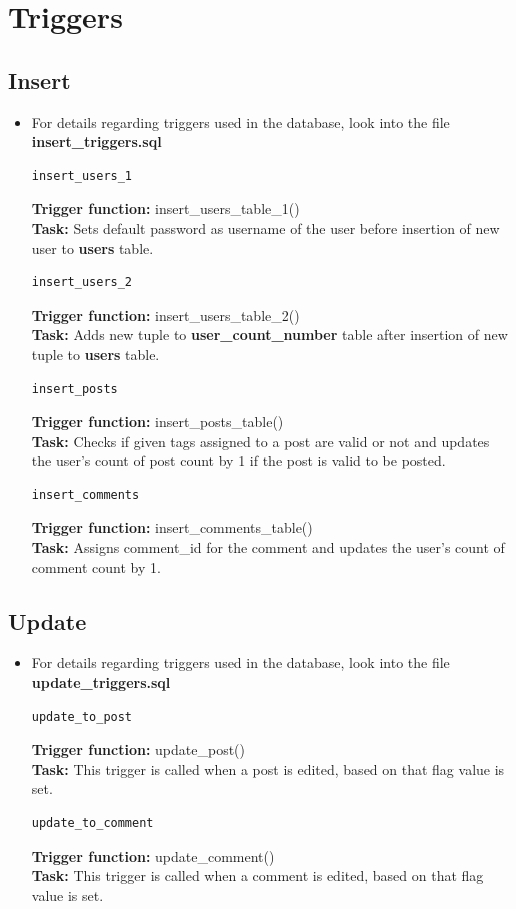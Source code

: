 \documentclass[12pt,a4paper]{article}
\begin{document}
	\section{Triggers}

	\subsection{Insert}
		\begin{itemize}
	\item For details regarding triggers used in the database, look into the file \textbf{insert\_triggers.sql}
			\begin{lstlisting}[language=SQL, style = mystyle]
		insert_users_1 
	\end{lstlisting}
\textbf{Trigger function: }insert\_users\_table\_1()\\
\textbf{Task: }Sets default password as username of the user before insertion of new user to \textbf{users} table.
			\begin{lstlisting}[language=SQL, style = mystyle]
	insert_users_2
\end{lstlisting}
\textbf{Trigger function: }insert\_users\_table\_2()\\
\textbf{Task: }Adds new tuple to \textbf{user\_count\_number} table after insertion of new tuple to \textbf{users} table.
			\begin{lstlisting}[language=SQL, style = mystyle]
	insert_posts 
\end{lstlisting}
\textbf{Trigger function: }insert\_posts\_table()\\
\textbf{Task: }Checks if given tags assigned to a post are valid or not and updates the user's count of post count by 1 if the post is  valid to be posted.
			\begin{lstlisting}[language=SQL, style = mystyle]
	insert_comments 
\end{lstlisting}
\textbf{Trigger function: }insert\_comments\_table()\\
\textbf{Task: }Assigns comment\_id for the comment and updates the user's count of comment count by 1.
\end{itemize}
	\subsection{Update}
		\begin{itemize}
	\item For details regarding triggers used in the database, look into the file \textbf{update\_triggers.sql}
				\begin{lstlisting}[language=SQL, style = mystyle]
		update_to_post 
	\end{lstlisting}
	\textbf{Trigger function: }update\_post()\\
	\textbf{Task: }This trigger is called when a post is edited, based on that flag value is set.
				\begin{lstlisting}[language=SQL, style = mystyle]
update_to_comment
\end{lstlisting}
\textbf{Trigger function: }update\_comment()\\
\textbf{Task: }This trigger is called when a comment is edited, based on that flag value is set.
	
\end{itemize}
\end{document}

